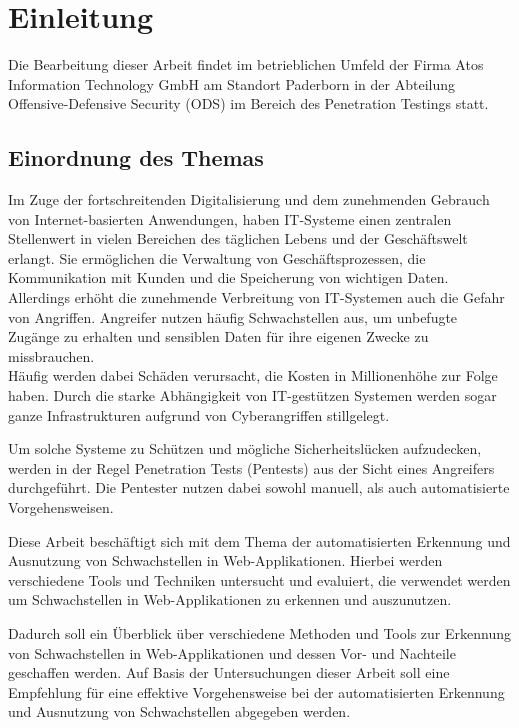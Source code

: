 \chapter{Einleitung}

Die Bearbeitung dieser Arbeit findet im betrieblichen Umfeld der Firma Atos Information Technology GmbH am Standort Paderborn in der Abteilung Offensive-Defensive Security (ODS) im Bereich des Penetration Testings statt.

\section{Einordnung des Themas}

Im Zuge der fortschreitenden Digitalisierung und dem zunehmenden Gebrauch von Internet-basierten Anwendungen, haben IT-Systeme einen zentralen Stellenwert in vielen Bereichen des täglichen Lebens und der Geschäftswelt erlangt. Sie ermöglichen die Verwaltung von Geschäftsprozessen, die Kommunikation mit Kunden und die Speicherung von wichtigen Daten. \\
Allerdings erhöht die zunehmende Verbreitung von IT-Systemen auch die Gefahr von Angriffen. Angreifer nutzen häufig Schwachstellen aus, um unbefugte Zugänge zu erhalten und sensiblen Daten für ihre eigenen Zwecke zu missbrauchen.  \\
Häufig werden dabei Schäden verursacht, die Kosten in Millionenhöhe zur Folge haben. Durch die starke Abhängigkeit von IT-gestützen Systemen werden sogar ganze Infrastrukturen aufgrund von Cyberangriffen stillgelegt.

Um solche Systeme zu Schützen und mögliche Sicherheitslücken aufzudecken, werden in der Regel Penetration Tests (Pentests) aus der Sicht eines Angreifers durchgeführt. Die Pentester nutzen dabei sowohl manuell, als auch automatisierte Vorgehensweisen.

Diese Arbeit beschäftigt sich mit dem Thema der automatisierten Erkennung und Ausnutzung von Schwachstellen in Web-Applikationen. Hierbei werden verschiedene Tools und Techniken untersucht und evaluiert, die verwendet werden um Schwachstellen in Web-Applikationen zu erkennen und auszunutzen.

Dadurch soll ein Überblick über verschiedene Methoden und Tools zur Erkennung von Schwachstellen in Web-Applikationen und dessen Vor- und Nachteile geschaffen werden. Auf Basis der Untersuchungen dieser Arbeit soll eine Empfehlung für eine effektive Vorgehensweise bei der automatisierten Erkennung und Ausnutzung von Schwachstellen abgegeben werden. 




